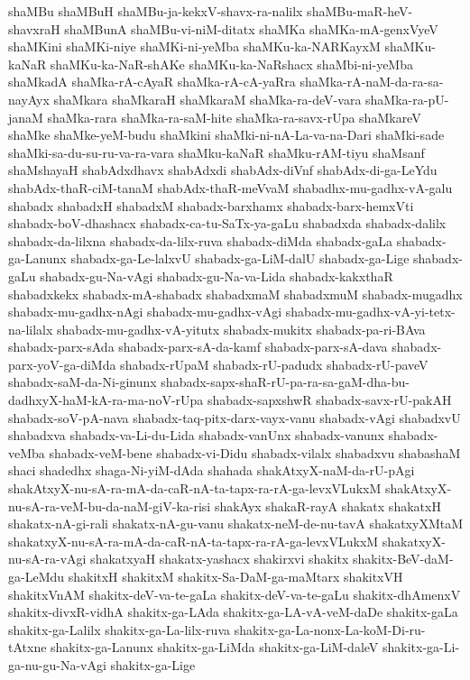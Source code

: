 {shaMBu
shaMBuH
shaMBu-ja-kekxV-shavx-ra-nalilx
shaMBu-maR-heV-shavxraH
shaMBunA
shaMBu-vi-niM-ditatx
shaMKa
shaMKa-mA-genxVyeV
shaMKini
shaMKi-niye
shaMKi-ni-yeMba
shaMKu-ka-NARKayxM
shaMKu-kaNaR
shaMKu-ka-NaR-shAKe
shaMKu-ka-NaRshacx
shaMbi-ni-yeMba
shaMkadA
shaMka-rA-cAyaR
shaMka-rA-cA-yaRra
shaMka-rA-naM-da-ra-sa-nayAyx
shaMkara
shaMkaraH
shaMkaraM
shaMka-ra-deV-vara
shaMka-ra-pU-janaM
shaMka-rara
shaMka-ra-saM-hite
shaMka-ra-savx-rUpa
shaMkareV
shaMke
shaMke-yeM-budu
shaMkini
shaMki-ni-nA-La-va-na-Dari
shaMki-sade
shaMki-sa-du-su-ru-va-ra-vara
shaMku-kaNaR
shaMku-rAM-tiyu
shaMsanf
shaMshayaH
shabAdxdhavx
shabAdxdi
shabAdx-diVnf
shabAdx-di-ga-LeYdu
shabAdx-thaR-ciM-tanaM
shabAdx-thaR-meVvaM
shabadhx-mu-gadhx-vA-galu
shabadx
shabadxH
shabadxM
shabadx-barxhamx
shabadx-barx-hemxVti
shabadx-boV-dhashacx
shabadx-ca-tu-SaTx-ya-gaLu
shabadxda
shabadx-dalilx
shabadx-da-lilxna
shabadx-da-lilx-ruva
shabadx-diMda
shabadx-gaLa
shabadx-ga-Lanunx
shabadx-ga-Le-lalxvU
shabadx-ga-LiM-dalU
shabadx-ga-Lige
shabadx-gaLu
shabadx-gu-Na-vAgi
shabadx-gu-Na-va-Lida
shabadx-kakxthaR
shabadxkekx
shabadx-mA-shabadx
shabadxmaM
shabadxmuM
shabadx-mugadhx
shabadx-mu-gadhx-nAgi
shabadx-mu-gadhx-vAgi
shabadx-mu-gadhx-vA-yi-tetx-na-lilalx
shabadx-mu-gadhx-vA-yitutx
shabadx-mukitx
shabadx-pa-ri-BAva
shabadx-parx-sAda
shabadx-parx-sA-da-kamf
shabadx-parx-sA-dava
shabadx-parx-yoV-ga-diMda
shabadx-rUpaM
shabadx-rU-padudx
shabadx-rU-paveV
shabadx-saM-da-Ni-ginunx
shabadx-sapx-shaR-rU-pa-ra-sa-gaM-dha-bu-dadhxyX-haM-kA-ra-ma-noV-rUpa
shabadx-sapxshwR
shabadx-savx-rU-pakAH
shabadx-soV-pA-nava
shabadx-taq-pitx-darx-vayx-vanu
shabadx-vAgi
shabadxvU
shabadxva
shabadx-va-Li-du-Lida
shabadx-vanUnx
shabadx-vanunx
shabadx-veMba
shabadx-veM-bene
shabadx-vi-Didu
shabadx-vilalx
shabadxvu
shabashaM
shaci
shadedhx
shaga-Ni-yiM-dAda
shahada
shakAtxyX-naM-da-rU-pAgi
shakAtxyX-nu-sA-ra-mA-da-caR-nA-ta-tapx-ra-rA-ga-levxVLukxM
shakAtxyX-nu-sA-ra-veM-bu-da-naM-giV-ka-risi
shakAyx
shakaR-rayA
shakatx
shakatxH
shakatx-nA-gi-rali
shakatx-nA-gu-vanu
shakatx-neM-de-nu-tavA
shakatxyXMtaM
shakatxyX-nu-sA-ra-mA-da-caR-nA-ta-tapx-ra-rA-ga-levxVLukxM
shakatxyX-nu-sA-ra-vAgi
shakatxyaH
shakatx-yashacx
shakirxvi
shakitx
shakitx-BeV-daM-ga-LeMdu
shakitxH
shakitxM
shakitx-Sa-DaM-ga-maMtarx
shakitxVH
shakitxVnAM
shakitx-deV-va-te-gaLa
shakitx-deV-va-te-gaLu
shakitx-dhAmenxV
shakitx-divxR-vidhA
shakitx-ga-LAda
shakitx-ga-LA-vA-veM-daDe
shakitx-gaLa
shakitx-ga-Lalilx
shakitx-ga-La-lilx-ruva
shakitx-ga-La-nonx-La-koM-Di-ru-tAtxne
shakitx-ga-Lanunx
shakitx-ga-LiMda
shakitx-ga-LiM-daleV
shakitx-ga-Li-ga-nu-gu-Na-vAgi
shakitx-ga-Lige
}
